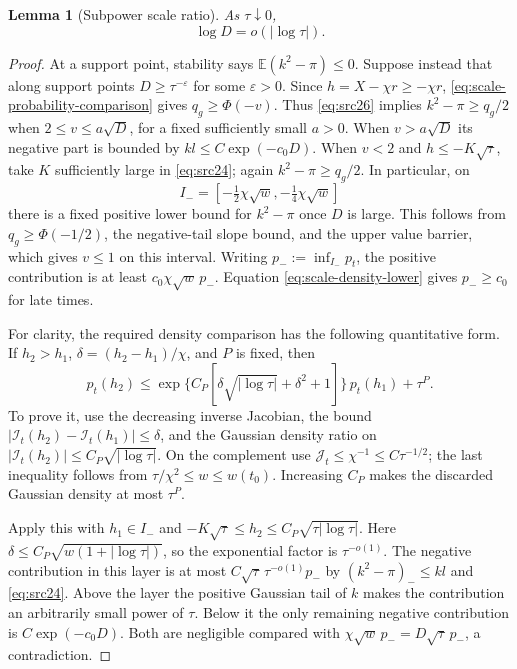 \documentclass[11pt,a4paper]{article}
\numberwithin{equation}{section}
\newtheorem{lemma}[theorem]{Lemma}
\theoremstyle{definition}
\theoremstyle{remark}
\newcommand{\E}{\mathbb E}
\newcommand{\eps}{\varepsilon}
\begin{document}
\begin{lemma}[Subpower scale ratio]\label{lem:scale-subpower}
As $\tau\downarrow0$,
\begin{equation}\label{eq:src25}
 \log D=o(|\log\tau|).
\end{equation}
\end{lemma}
\begin{proof}
At a support point, stability says
$\E(k^2-\pi)\le0$. Suppose instead that along support points
$D\ge\tau^{-\eps}$ for some $\eps>0$.
Since $h=X-\chi r\ge-\chi r$, \eqref{eq:scale-probability-comparison}
gives $q_g\ge\Phi(-v)$. Thus \eqref{eq:src26} implies
$k^2-\pi\ge q_g/2$ when
$2\le v\le a\sqrt D$, for a fixed sufficiently small $a>0$.
When $v>a\sqrt D$ its negative part is bounded by
$kl\le C\exp(-c_0D)$.
When $v<2$ and $h\le-K\sqrt\tau$, take $K$ sufficiently large in
\eqref{eq:src24}; again $k^2-\pi\ge q_g/2$.
In particular, on
\[
 I_-=\left[-\tfrac12\chi\sqrt w,-\tfrac14\chi\sqrt w\right]
\]
there is a fixed positive lower bound for $k^2-\pi$ once $D$ is large.
This follows from $q_g\ge\Phi(-1/2)$, the negative-tail slope bound,
and the upper value barrier, which gives $v\le1$ on this interval.
Writing $p_-:=\inf_{I_-}p_t$, the positive contribution is at least
$c_0\chi\sqrt w\,p_-$. Equation
\eqref{eq:scale-density-lower} gives $p_-\ge c_0$ for late times.

For clarity, the required density comparison has the following
quantitative form. If $h_2>h_1$, $\delta=(h_2-h_1)/\chi$, and $P$ is
fixed, then
\begin{equation}\label{eq:scale-truncated-density}
 p_t(h_2)\le
 \exp\!\{C_P[\delta\sqrt{|\log\tau|}+\delta^2+1]\}\,p_t(h_1)
 +\tau^P.
\end{equation}
To prove it, use the decreasing inverse Jacobian, the bound
$|\mathcal I_t(h_2)-\mathcal I_t(h_1)|\le\delta$, and the Gaussian density ratio on
$|\mathcal I_t(h_2)|\le C_P\sqrt{|\log\tau|}$. On the complement use
$\mathcal J_t\le\chi^{-1}\le C\tau^{-1/2}$; the last inequality follows from
$\tau/\chi^2\le w\le w(t_0)$. Increasing $C_P$ makes the discarded
Gaussian density at most $\tau^P$.

Apply this with $h_1\in I_-$ and
$-K\sqrt\tau\le h_2\le C_P\sqrt{\tau|\log\tau|}$.
Here $\delta\le C_P\sqrt{w(1+|\log\tau|)}$, so the exponential factor
is $\tau^{-o(1)}$. The negative contribution in this layer is at most
$C\sqrt\tau\,\tau^{-o(1)}p_-$ by
$(k^2-\pi)_-\le kl$ and \eqref{eq:src24}.
Above the layer the positive Gaussian tail of $k$ makes the contribution
an arbitrarily small power of $\tau$. Below it the only remaining
negative contribution is $C\exp(-c_0D)$. Both are negligible compared
with $\chi\sqrt w\,p_-=D\sqrt\tau\,p_-$, a contradiction.


\end{proof}
\end{document}
